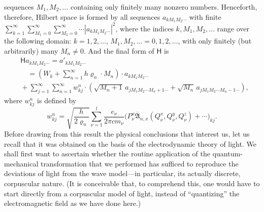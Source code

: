 \documentclass[fontsize=13pt,twoside,openany,headings=normal,parskip=false,bookmarkpackage=false,DIV=calc]{scrbook}
\begin{document}
\hypertarget{origpage-144}{}sequences $M_1,M_2,\ldots$ containing only finitely many nonzero numbers. Henceforth, therefore, Hilbert space is formed by all sequences $a_{kM_1M_2\cdots}$ with finite $\sum_{k=1}^{\infty}\sum_{M_1=0}^{\infty}\sum_{M_2=0}^{\infty}\cdots|a_{kM_1M_2\cdots}|^2$, where the indices $k,M_1,M_2,\ldots$ range over the following domain: $k=1,2,\ldots$, $M_1,M_2,\ldots=0,1,2,\ldots$, with only finitely (but arbitrarily) many $M_n\ne0$. And the final form of $\mathsf{H}$ is
\begin{align*}
 &\mathsf{H}a_{kM_1M_2\cdots}=a'_{kM_1M_2\cdots}\\
 &\quad={}\left(W_k+\sum_{n=1}^{\infty}h\varrho_n\cdot M_n\right)\cdot a_{kM_1M_2\cdots}\\
 &{}+\sum_{j=1}^{\infty}\sum_{n=1}^{\infty}w_{kj}^n\cdot
 \left(\sqrt{M_n+1}\,a_{jM_1M_2\cdots M_n+1\cdots}
 +\sqrt{M_n}\,a_{jM_1M_2\cdots M_n-1\cdots}\right),
\end{align*}
where $w_{kj}^n$ is defined by
\[
 w_{kj}^n=\sqrt{\frac h{2\varrho_n}}\sum_{\nu=1}^{l}\frac{e_\nu}{2\pi cm_\nu}
 \bigl(P_\nu^x\overline{\mathfrak A}_{n,x}(Q_\nu^x,Q_\nu^y,Q_\nu^z)+\cdots\bigr)_{kj}.
\]
Before drawing from this result the physical conclusions that interest us, let us recall that it was obtained on the basis of the electrodynamic theory of light. We shall first want to ascertain whether the routine application of the quantum-mechanical transformation that we performed has sufficed to reproduce the deviations of light from the wave model---in particular, its actually discrete, corpuscular nature. (It is conceivable that, to comprehend this, one would have to start directly from a corpuscular model of light, instead of ``quantizing'' the electromagnetic field as we have done here.)
\end{document}
